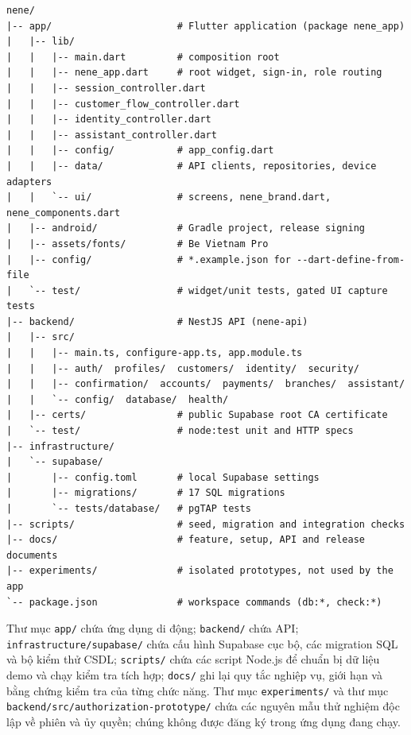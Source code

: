 \begin{lstlisting}[caption={Cấu trúc thư mục chính của kho mã Nene},label={lst:ch3-tree}]
nene/
|-- app/                      # Flutter application (package nene_app)
|   |-- lib/
|   |   |-- main.dart         # composition root
|   |   |-- nene_app.dart     # root widget, sign-in, role routing
|   |   |-- session_controller.dart
|   |   |-- customer_flow_controller.dart
|   |   |-- identity_controller.dart
|   |   |-- assistant_controller.dart
|   |   |-- config/           # app_config.dart
|   |   |-- data/             # API clients, repositories, device adapters
|   |   `-- ui/               # screens, nene_brand.dart, nene_components.dart
|   |-- android/              # Gradle project, release signing
|   |-- assets/fonts/         # Be Vietnam Pro
|   |-- config/               # *.example.json for --dart-define-from-file
|   `-- test/                 # widget/unit tests, gated UI capture tests
|-- backend/                  # NestJS API (nene-api)
|   |-- src/
|   |   |-- main.ts, configure-app.ts, app.module.ts
|   |   |-- auth/  profiles/  customers/  identity/  security/
|   |   |-- confirmation/  accounts/  payments/  branches/  assistant/
|   |   `-- config/  database/  health/
|   |-- certs/                # public Supabase root CA certificate
|   `-- test/                 # node:test unit and HTTP specs
|-- infrastructure/
|   `-- supabase/
|       |-- config.toml       # local Supabase settings
|       |-- migrations/       # 17 SQL migrations
|       `-- tests/database/   # pgTAP tests
|-- scripts/                  # seed, migration and integration checks
|-- docs/                     # feature, setup, API and release documents
|-- experiments/              # isolated prototypes, not used by the app
`-- package.json              # workspace commands (db:*, check:*)
\end{lstlisting}

Thư mục \texttt{app/} chứa ứng dụng di động; \texttt{backend/} chứa API; \texttt{infrastructure/\allowbreak{}supabase/} chứa cấu hình Supabase cục bộ, các migration SQL và bộ kiểm thử CSDL; \texttt{scripts/} chứa các script Node.js để chuẩn bị dữ liệu demo và chạy kiểm tra tích hợp; \texttt{docs/} ghi lại quy tắc nghiệp vụ, giới hạn và bằng chứng kiểm tra của từng chức năng. Thư mục \texttt{experiments/} và thư mục \texttt{backend/\allowbreak{}src/\allowbreak{}authorization-\allowbreak{}prototype/} chứa các nguyên mẫu thử nghiệm độc lập về phiên và ủy quyền; chúng không được đăng ký trong ứng dụng đang chạy.

